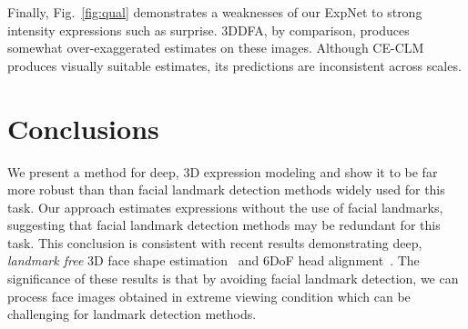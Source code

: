 \documentclass[a4paper, 10pt, conference]{ieeeconf}
\begin{document}
Finally, Fig.~\ref{fig:qual} demonstrates a weaknesses of our ExpNet to strong intensity expressions such as surprise. 3DDFA, by comparison, produces somewhat over-exaggerated estimates on these images. Although CE-CLM produces visually suitable estimates, its predictions are inconsistent across scales.


\section{Conclusions}\label{sec:conclu}
We present a method for deep, 3D expression modeling and show it to be far more robust than than facial landmark detection methods widely used for this task. Our approach estimates expressions without the use of facial landmarks, suggesting that facial landmark detection methods may be redundant for this task. This conclusion is consistent with recent results demonstrating deep, {\em landmark free} 3D face shape estimation~\cite{chang17fpn} and 6DoF head alignment~\cite{tran16_3dmm_cnn}. The significance of these results is that by avoiding facial landmark detection, we can process face images obtained in extreme viewing condition which can be challenging for landmark detection methods.

%
\end{document}
